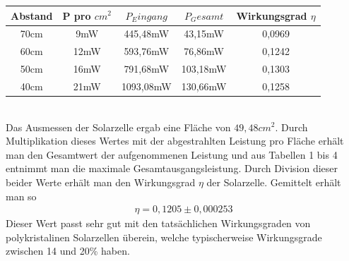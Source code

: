 \begin{tabular}{|c|c|c|c|c|}
\hline 
Abstand & P pro $cm^2$ & $P_Eingang$ & $P_Gesamt$ & Wirkungsgrad $\eta$ \\ 
\hline 
70cm & 9mW & 445,48mW & 43,15mW & 0,0969 \\ 
\hline 
60cm & 12mW & 593,76mW & 76,86mW & 0,1242 \\ 
\hline 
50cm & 16mW & 791,68mW & 103,18mW & 0,1303 \\ 
\hline 
40cm  & 21mW & 1093,08mW & 130,66mW & 0,1258 \\ 
\hline 
\end{tabular} \\

Das Ausmessen der Solarzelle ergab eine Fläche von $49,48cm^2$. Durch Multiplikation dieses Wertes mit der abgestrahlten Leistung pro Fläche erhält man den Gesamtwert der aufgenommenen Leistung und aus Tabellen 1 bis 4 entnimmt man die maximale Gesamtausgangsleistung. Durch Division dieser beider Werte erhält man den Wirkungsgrad $\eta$ der Solarzelle. 
Gemittelt erhält man so
\begin{align*}
	\eta=0,1205 \pm 0,000253
\end{align*} 
Dieser Wert passt sehr gut mit den tatsächlichen Wirkungsgraden von polykristalinen Solarzellen überein, welche typischerweise Wirkungsgrade zwischen 14 und 20\% haben.

